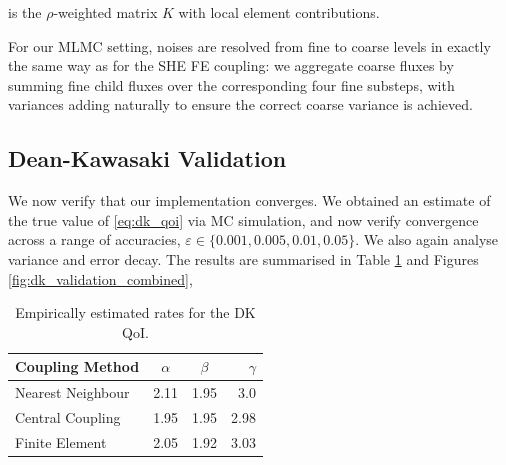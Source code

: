 is the $\rho$-weighted matrix $K$ with local element contributions.

For our MLMC setting, noises are resolved from fine to coarse levels in exactly the
same way as for the SHE FE coupling: we aggregate coarse fluxes by summing  
fine child fluxes over the corresponding four fine substeps, with variances adding
naturally to ensure the correct coarse variance is achieved.

\subsection{Dean-Kawasaki Validation}\label{sec:dk_validation}

We now verify that our implementation converges. We obtained an estimate of the true 
value of \eqref{eq:dk_qoi} via MC simulation, and now verify convergence 
across a range of accuracies, 
$\varepsilon \in \{0.001, 0.005, 0.01, 0.05\}$. We also again 
analyse variance and error decay. The results are summarised in Table 
\ref{tab:dk_rates} and Figures \ref{fig:dk_validation_combined},

\begin{table}[htbp]
    \centering
    \begin{tabular}{|l|c|c|r|}
        \hline
        \textbf{Coupling Method} & \textbf{$\alpha$} & \textbf{$\beta$} & \textbf{$\gamma$} \\
        \hline
        Nearest Neighbour & 2.11 & 1.95 & 3.0\\
        Central Coupling & 1.95 & 1.95 & 2.98 \\
        Finite Element &  2.05 & 1.92 & 3.03 \\
        \hline
    \end{tabular}
    \caption{Empirically estimated rates for the DK QoI.}
    \label{tab:dk_rates}
\end{table}

